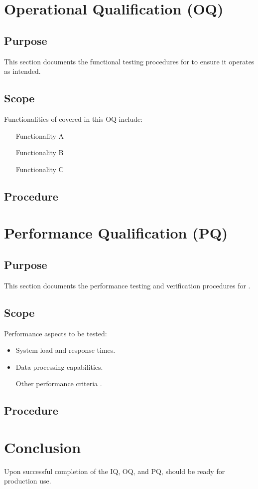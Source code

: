 \documentclass[12pt]{article}
\begin{document}
\section{Operational Qualification (OQ)}
\subsection{Purpose}
This section documents the functional testing procedures for \softwareName to ensure it operates as intended.

\subsection{Scope}
Functionalities of \softwareName covered in this OQ include:

\begin{itemize}
    \item [Functionality A]
    \item [Functionality B]
    \item [Functionality C]
\end{itemize}

\subsection{Procedure}
\lipsum[1]  %

\section{Performance Qualification (PQ)}
\subsection{Purpose}
This section documents the performance testing and verification procedures for \softwareName.

\subsection{Scope}
Performance aspects to be tested:

\begin{itemize}
    \item System load and response times.
    \item Data processing capabilities.
    \item [Other performance criteria].
\end{itemize}

\subsection{Procedure}
\lipsum[2]  %

\section*{Conclusion}
Upon successful completion of the IQ, OQ, and PQ, \softwareName should be ready for production use.
\end{document}
